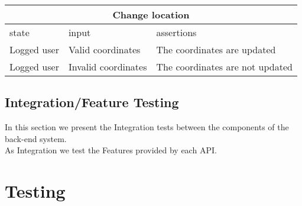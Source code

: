 \begin{center}
	\begin{tabular}{|p{}|p{}|p{}|}
		\hline
		\multicolumn{3}{c}{Change location}\\
		\hline
		state & input & assertions \\
		\hline
		Logged user &
		Valid coordinates& 
		The coordinates are updated \newline
		\\
		\hline
		Logged user &
		Invalid coordinates& 
		The coordinates are not updated \newline
		\\
		\hline
	\end{tabular}
\end{center}

\subsection{Integration/Feature Testing}
In this section we present the Integration tests between the components of the back-end system.\\
As Integration we test the Features provided by each API.\\



\section{Testing}
